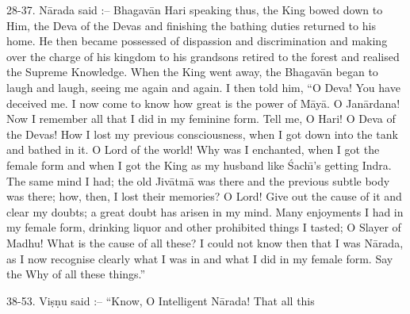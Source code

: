 28-37. N\=arada said :-- Bhagav\=an Hari speaking thus, the King bowed down to Him, the Deva of the Devas and finishing the bathing duties returned to his home. He then became possessed of dispassion and discrimination and making over the charge of his kingdom to his grandsons retired to the forest and realised the Supreme Knowledge. When the King went away, the Bhagav\=an began to laugh and laugh, seeing me again and again. I then told him, ``O Deva! You have deceived me. I now come to know how great is the power of M\=ay\=a. O Jan\=ardana! Now I remember all that I did in my feminine form. Tell me, O Hari! O Deva of the Devas! How I lost my previous consciousness, when I got down into the tank and bathed in it. O Lord of the world! Why was I enchanted, when I got the female form and when I got the King as my husband like \'Sach\={\i}'s getting Indra. The same mind I had; the old Jiv\=atm\=a was there and the previous subtle body was there; how, then, I lost their memories? O Lord! Give out the cause of it and clear my doubts; a great doubt has arisen in my mind. Many enjoyments I had in my female form, drinking liquor and other prohibited things I tasted; O Slayer of Madhu! What is the cause of all these? I could not know then that I was N\=arada, as I now recognise clearly what I was in and what I did in my female form. Say the Why of all these things.''

38-53. Vi\d{s}\d{n}u said :-- ``Know, O Intelligent N\=arada! That all this

